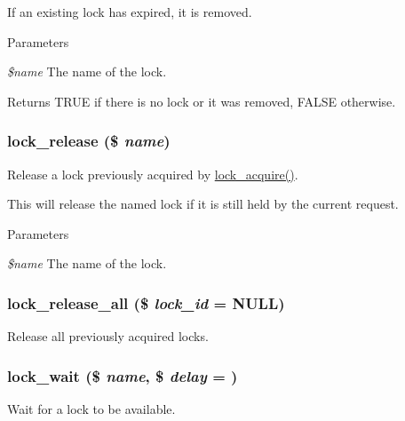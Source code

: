If an existing lock has expired, it is removed.


\begin{DoxyParams}{Parameters}
\item[{\em \$name}]The name of the lock.\end{DoxyParams}
\begin{DoxyReturn}{Returns}
TRUE if there is no lock or it was removed, FALSE otherwise. 
\end{DoxyReturn}
\hypertarget{group__lock_ga73e1456861f9aff1a506a650f43aceb0}{
\subsubsection[{lock\_\-release}]{\setlength{\rightskip}{0pt plus 5cm}lock\_\-release (\$ {\em name})}}
\label{group__lock_ga73e1456861f9aff1a506a650f43aceb0}
Release a lock previously acquired by \hyperlink{group__lock_gac67a4b1061491f7a869646f47b66e998}{lock\_\-acquire()}.

This will release the named lock if it is still held by the current request.


\begin{DoxyParams}{Parameters}
\item[{\em \$name}]The name of the lock. \end{DoxyParams}
\hypertarget{group__lock_ga290817e14e2a9ecc0bd34c6b7b0af031}{
\subsubsection[{lock\_\-release\_\-all}]{\setlength{\rightskip}{0pt plus 5cm}lock\_\-release\_\-all (\$ {\em lock\_\-id} = {\ttfamily NULL})}}
\label{group__lock_ga290817e14e2a9ecc0bd34c6b7b0af031}
Release all previously acquired locks. \hypertarget{group__lock_ga54c2ee771edac47614b8f12d949d3376}{
\subsubsection[{lock\_\-wait}]{\setlength{\rightskip}{0pt plus 5cm}lock\_\-wait (\$ {\em name}, \/  \$ {\em delay} = {})}}
\label{group__lock_ga54c2ee771edac47614b8f12d949d3376}
Wait for a lock to be available.

